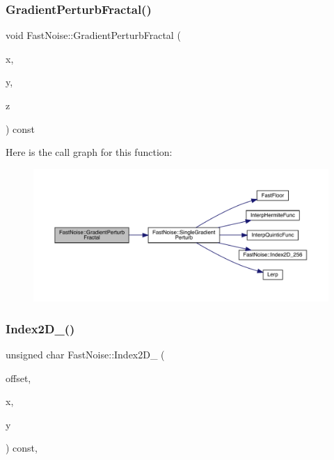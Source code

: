 \subsubsection{\texorpdfstring{Gradient\+Perturb\+Fractal()}{GradientPerturbFractal()}\hspace{0.1cm}{\footnotesize\ttfamily [2/2]}}
{\footnotesize\ttfamily void Fast\+Noise\+::\+Gradient\+Perturb\+Fractal (\begin{DoxyParamCaption}\item[{\mbox{\hyperlink{_fast_noise_8h_a75a9ef6d2541c4921815b885bfd449c3}{F\+N\+\_\+\+D\+E\+C\+I\+M\+AL}} \&}]{x,  }\item[{\mbox{\hyperlink{_fast_noise_8h_a75a9ef6d2541c4921815b885bfd449c3}{F\+N\+\_\+\+D\+E\+C\+I\+M\+AL}} \&}]{y,  }\item[{\mbox{\hyperlink{_fast_noise_8h_a75a9ef6d2541c4921815b885bfd449c3}{F\+N\+\_\+\+D\+E\+C\+I\+M\+AL}} \&}]{z }\end{DoxyParamCaption}) const}

Here is the call graph for this function\+:
\nopagebreak
\begin{figure}[H]
\begin{center}
\leavevmode
\includegraphics[width=350pt]{class_fast_noise_a155a219f6356b75e3dfc2610d03e801a_cgraph}
\end{center}
\end{figure}
\mbox{\label{class_fast_noise_aa4cae648a6a3817d77dcd7439f711827}} 
\subsubsection{\texorpdfstring{Index2\+D\+\_()}{Index2D\_12()}}
{\footnotesize\ttfamily unsigned char Fast\+Noise\+::\+Index2\+D\+\_ (\begin{DoxyParamCaption}\item[{unsigned char}]{offset,  }\item[{int}]{x,  }\item[{int}]{y }\end{DoxyParamCaption}) const\hspace{0.3cm}{\ttfamily [inline]}, {\ttfamily [private]}}

